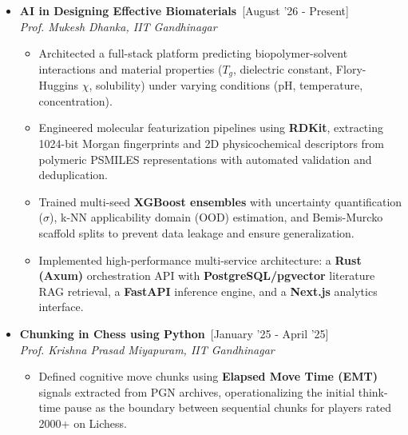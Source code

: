 \documentclass[a4paper,10pt]{article}
\newcommand{\isep}{-2 pt}
\begin{document}
\begin{itemize}\itemsep \isep

    \item \textbf{AI in Designing Effective Biomaterials}\ \hfill [August '26 - Present] \\
    \textit{Prof. Mukesh Dhanka, IIT Gandhinagar}
    \\[-0.7cm]

    \begin{itemize}\itemsep \isep

        \item Architected a full-stack platform predicting biopolymer-solvent interactions and material properties ($T_g$, dielectric constant, Flory-Huggins $\chi$, solubility) under varying conditions (pH, temperature, concentration).

        \item Engineered molecular featurization pipelines using \textbf{RDKit}, extracting 1024-bit Morgan fingerprints and 2D physicochemical descriptors from polymeric PSMILES representations with automated validation and deduplication.

        \item Trained multi-seed \textbf{XGBoost ensembles} with uncertainty quantification ($\sigma$), k-NN applicability domain (OOD) estimation, and Bemis-Murcko scaffold splits to prevent data leakage and ensure generalization.

        \item Implemented high-performance multi-service architecture: a \textbf{Rust (Axum)} orchestration API with \textbf{PostgreSQL/pgvector} literature RAG retrieval, a \textbf{FastAPI} inference engine, and a \textbf{Next.js} analytics interface.

    \end{itemize}


    \item \textbf{Chunking in Chess using Python}\ \hfill [January '25 - April '25] \\
    \textit{Prof. Krishna Prasad Miyapuram, IIT Gandhinagar}
    \\[-0.7cm]

    \begin{itemize}\itemsep \isep

        \item Defined cognitive move chunks using \textbf{Elapsed Move Time (EMT)} signals extracted from PGN archives, operationalizing the initial think-time pause as the boundary between sequential chunks for players rated 2000+ on Lichess.


\end{itemize}
\end{itemize}
\end{document}
